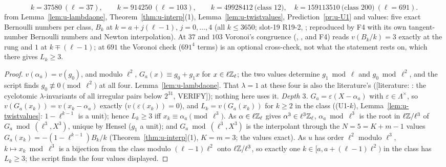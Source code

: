 \documentclass[11pt]{article}
\newcommand{\LIT}[1]{\textsf{[literature: #1]}}   %
\newcommand{\VERIFYloc}{\textsf{VERIFY}}          %
\newcommand{\Iw}{\Lambda}                         %
\newcommand{\Zl}{\Z_\ell}
\begin{document}
\begin{proposition}
\[
  k=37580\ (\ell=37),\qquad k=914250\ (\ell=103),\qquad k=49928412\ \text{(class $12$)},\quad k=159113510\ \text{(class $200$)}\ (\ell=691).
\]
\PROVED{} from Lemma~\ref{lem:u-lambdaone}, Theorem~\ref{thm:u-interp}(1), Lemma~\ref{lem:u-twistvalues}, Prediction~\ref{pr:u-U1} and \COMP{} values: five exact
Bernoulli numbers per class, $B_k$ at $k=a+j(\ell-1)$, $j=0,\dots,4$ (all $k\le3650$; slot-19 R19-2, ; reproduced by
F4 with its own tangent-number Bernoulli numbers and Newton interpolation). At $37$ and $103$ Voronoi's congruence (\COMP, , and F4) reads
$v(B_k/k)=3$ exactly at the rung and $1$ at $k\mp(\ell-1)$; at $691$ the Voronoi check ($691^{4}$ terms) is an optional cross-check, not what the statement rests on,
which there gives $L_k\ge3$.
\end{proposition}

\begin{proof}
$v(\alpha_a)=v(g_0)$, and modulo $\ell^{2}$, $G_a(x)\equiv g_0+g_1x$ for $x\in\ell\Zl$; the two values determine $g_1\bmod\ell$ and $g_0\bmod\ell^{2}$, and the script
finds $g_0\not\equiv0\pmod{\ell^{2}}$ at all four. Lemma~\ref{lem:u-lambdaone}. That $\lambda=1$ at these four is also the literature's (\LIT{\cite{hho}: the
cyclotomic $\lambda$-invariants of all irregular pairs below $2^{31}$, \VERIFYloc}); nothing here uses it.
\emph{Depth $3$.} $G_a=\varepsilon(X-\alpha_a)$ with $\varepsilon\in\Iw^{\times}$, so $v(G_a(x_k))=v(x_k-\alpha_a)$ exactly ($v(\varepsilon(x_k))=0$), and $L_k=v(G_a(x_k))$ for
$k\ge2$ in the class ((U1-$k$), Lemma~\ref{lem:u-twistvalues}: $1-\ell^{k-1}$ is a unit); hence $L_k\ge3$ iff $x_k\equiv\alpha_a\pmod{\ell^{3}}$. As $\alpha\in\ell\Zl$ gives
$\alpha^{3}\in\ell^{3}\Zl$, $\alpha_a\bmod\ell^{3}$ is the root in $\ell\mathbb{Z}/\ell^{3}$ of $G_a\bmod(\ell^{3},X^{3})$, unique by Hensel ($g_1$ a unit); and
$G_a\bmod(\ell^{3},X^{3})$ is the interpolant through the $N=5=K+m-1$ values $G_a(x_k)=-(1-\ell^{k-1})B_k/k$ (Theorem~\ref{thm:u-interp}(1), $K=m=3$; the values exact).
As $u$ has order $\ell^{2}$ modulo $\ell^{3}$, $k\mapsto x_k\bmod\ell^{3}$ is a bijection from the class modulo $(\ell-1)\ell^{2}$ onto $\ell\mathbb{Z}/\ell^{3}$, so exactly one
$k\in[a,a+(\ell-1)\ell^{2})$ in the class has $L_k\ge3$; the script finds the four values displayed.
\end{proof}
\end{document}
